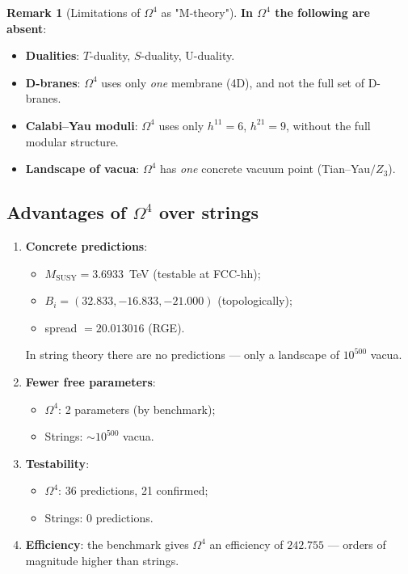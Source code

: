 \documentclass[11pt,a4paper]{article}
\newcommand{\Om}{\ensuremath{\Omega^4}}
\theoremstyle{definition}
\newtheorem{remark}[theorem]{Remark}
\begin{document}
\begin{remark}[Limitations of $\Om$ as "M-theory"]
\label{rem:string-mtheory-limits}
\textbf{In $\Om$ the following are absent}:
\begin{itemize}
    \item \textbf{Dualities}: $T$-duality, $S$-duality,
          U-duality.
    \item \textbf{D-branes}: $\Om$ uses only \emph{one}
          membrane (4D), and not the full set of D-branes.
    \item \textbf{Calabi--Yau moduli}: $\Om$ uses only
          $h^{11} = 6$, $h^{21} = 9$, without the full modular structure.
    \item \textbf{Landscape of vacua}: $\Om$ has \emph{one}
          concrete vacuum point (Tian--Yau$/Z_3$).
\end{itemize}
\end{remark}

\subsection{Advantages of \texorpdfstring{$\Om$}{Omega4} over strings}
\label{subsec:string-advantages}

\begin{enumerate}
    \item \textbf{Concrete predictions}:
          \begin{itemize}
              \item $M_{\text{SUSY}} = 3.6933$~TeV (testable at FCC-hh);
              \item $B_i = (32.833, -16.833, -21.000)$ (topologically);
              \item spread $= 20.013016$ (RGE).
          \end{itemize}
          In string theory there are no predictions ---
          only a landscape of $10^{500}$ vacua.
    \item \textbf{Fewer free parameters}:
          \begin{itemize}
              \item $\Om$: 2 parameters (by benchmark);
              \item Strings: $\sim 10^{500}$ vacua.
          \end{itemize}
    \item \textbf{Testability}:
          \begin{itemize}
              \item $\Om$: 36 predictions, 21 confirmed;
              \item Strings: 0 predictions.
          \end{itemize}
    \item \textbf{Efficiency}: the benchmark gives $\Om$ an efficiency
          of $242.755$ --- orders of magnitude higher than strings.
\end{enumerate}
\end{document}
